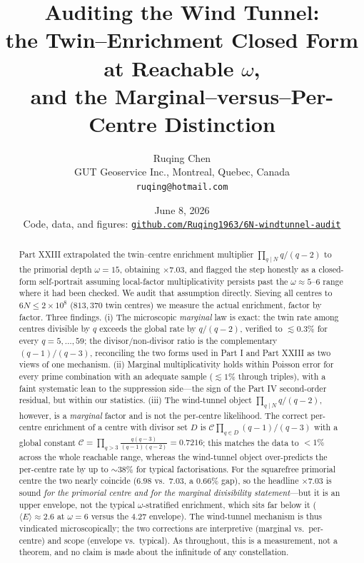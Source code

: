 \documentclass[11pt]{article}
\title{\bf Auditing the Wind Tunnel:\\
the Twin--Enrichment Closed Form at Reachable $\omega$,\\
and the Marginal--versus--Per-Centre Distinction}
\author{Ruqing Chen\\
\small GUT Geoservice Inc., Montreal, Quebec, Canada\\
\small \texttt{ruqing@hotmail.com}}
\date{June 8, 2026\\[4pt]
\small Code, data, and figures: \href{https://github.com/Ruqing1963/6N-windtunnel-audit}{\texttt{github.com/Ruqing1963/6N-windtunnel-audit}}}
\theoremstyle{definition}
\begin{document}
\maketitle

\begin{abstract}
Part XXIII extrapolated the twin--centre enrichment multiplier $\prod_{q\mid N} q/(q-2)$
to the primorial depth $\omega=15$, obtaining $\times 7.03$, and flagged the step honestly as a
closed-form self-portrait assuming local-factor multiplicativity persists past the $\omega\!\approx\!5\text{--}6$
range where it had been checked. We audit that assumption directly. Sieving all centres to
$6N\le 2\times 10^{8}$ ($813{,}370$ twin centres) we measure the actual enrichment, factor by factor.
Three findings. (i) The microscopic \emph{marginal} law is exact: the twin rate among centres divisible
by $q$ exceeds the global rate by $q/(q-2)$, verified to $\lesssim 0.3\%$ for every $q=5,\dots,59$; the
divisor/non-divisor ratio is the complementary $(q-1)/(q-3)$, reconciling the two forms used in Part I
and Part XXIII as two views of one mechanism. (ii) Marginal multiplicativity holds within Poisson error
for every prime combination with an adequate sample ($\lesssim 1\%$ through triples), with a faint
systematic lean to the suppression side---the sign of the Part IV second-order residual, but within our statistics.
(iii) The wind-tunnel object $\prod_{q\mid N}q/(q-2)$, however, is a \emph{marginal} factor and is not the
per-centre likelihood. The correct per-centre enrichment of a centre with divisor set $D$ is
$\mathcal{C}\prod_{q\in D}(q-1)/(q-3)$ with a global constant $\mathcal{C}=\prod_{q>3}\frac{q(q-3)}{(q-1)(q-2)}=0.7216$;
this matches the data to $<1\%$ across the whole reachable range, whereas the wind-tunnel object over-predicts
the per-centre rate by up to $\sim\!38\%$ for typical factorisations. For the squarefree primorial centre the
two nearly coincide ($6.98$ vs.\ $7.03$, a $0.66\%$ gap), so the headline $\times 7.03$ is sound \emph{for the
primorial centre and for the marginal divisibility statement}---but it is an upper envelope, not the typical
$\omega$-stratified enrichment, which sits far below it ($\langle E\rangle\!\approx\!2.6$ at $\omega=6$ versus the
$4.27$ envelope). The wind-tunnel mechanism is thus vindicated microscopically; the two corrections are
interpretive (marginal vs.\ per-centre) and scope (envelope vs.\ typical). As throughout, this is a measurement,
not a theorem, and no claim is made about the infinitude of any constellation.
\end{abstract}
\end{document}
